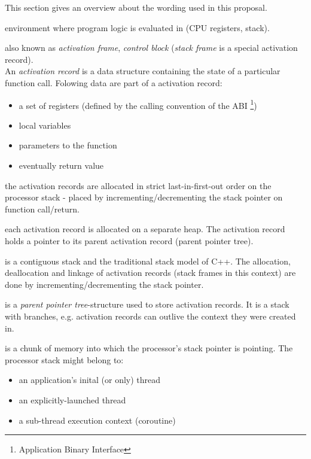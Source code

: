 This section gives an overview about the wording used in this proposal.

environment where program logic is evaluated in (CPU registers, stack).

also known as \emph{activation frame}, \emph{control block} (\emph{stack frame}
is a special activation record).\\
An \emph{activation record} is a data structure containing the state of a
particular function call. Folowing data are part of a activation record:
\begin{itemize}
    \item a set of registers (defined by the calling convention of the ABI
        \footnote{Application Binary Interface})
    \item local variables
    \item parameters to the function
    \item eventually return value
\end{itemize}

the activation records are allocated in strict last-in-first-out order on the
processor stack - placed by incrementing/decrementing the stack pointer on
function call/return.

each activation record is allocated on a separate heap. The activation record
holds a pointer to its parent activation record (parent pointer tree).

is a contiguous stack and the traditional stack model of C++. The allocation,
deallocation and linkage of activation records (stack frames in this context)
are done by incrementing/decrementing the stack pointer.

is a \emph{parent pointer tree}-structure used to store activation records. It
is a stack with branches, e.g. activation records can outlive the context they
were created in.

is a chunk of memory into which the processor's stack pointer is pointing. The
processor stack might belong to:
\begin{itemize}
    \item an application's inital (or only) thread
    \item an explicitly-launched thread
    \item a sub-thread execution context (coroutine)
\end{itemize}

